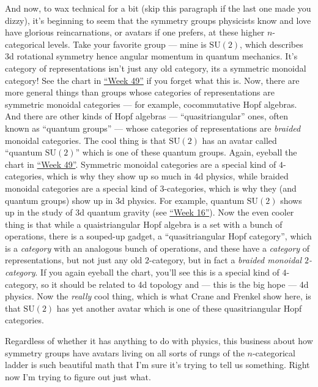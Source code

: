 \documentclass{article}
\begin{document}
And now, to wax technical for a bit (skip this paragraph if the last one
made you dizzy), it's beginning to seem that the symmetry groups
physicists know and love have glorious reincarnations, or avatars if one
prefers, at these higher \(n\)-categorical levels. Take your favorite
group --- mine is \(\mathrm{SU}(2)\), which describes 3d rotational
symmetry hence angular momentum in quantum mechanics. It's category of
representations isn't just any old category, its a symmetric monoidal
category! See the chart in \protect\hyperlink{week49}{``Week 49''} if
you forget what this is. Now, there are more general things than groups
whose categories of representations are symmetric monoidal categories
--- for example, cocommutative Hopf algebras. And there are other kinds
of Hopf algebras --- ``quasitriangular'' ones, often known as ``quantum
groups'' --- whose categories of representations are \emph{braided}
monoidal categories. The cool thing is that \(\mathrm{SU}(2)\) has an
avatar called ``quantum \(\mathrm{SU}(2)\)'' which is one of these
quantum groups. Again, eyeball the chart in
\protect\hyperlink{week49}{``Week 49''}. Symmetric monoidal categories
are a special kind of \(4\)-categories, which is why they show up so
much in 4d physics, while braided monoidal categories are a special kind
of \(3\)-categories, which is why they (and quantum groups) show up in
3d physics. For example, quantum \(\mathrm{SU}(2)\) shows up in the
study of 3d quantum gravity (see \protect\hyperlink{week16}{``Week
16''}). Now the even cooler thing is that while a quaistriangular Hopf
algebra is a set with a bunch of operations, there is a souped-up
gadget, a ``quasitriangular Hopf category'', which is a \emph{category}
with an analogous bunch of operations, and these have a \emph{category}
of representations, but not just any old \(2\)-category, but in fact a
\emph{braided monoidal \(2\)-category}. If you again eyeball the chart,
you'll see this is a special kind of \(4\)-category, so it should be
related to 4d topology and --- this is the big hope --- 4d physics. Now
the \emph{really} cool thing, which is what Crane and Frenkel show here,
is that \(\mathrm{SU}(2)\) has yet another avatar which is one of these
quasitriangular Hopf categories.

Regardless of whether it has anything to do with physics, this business
about how symmetry groups have avatars living on all sorts of rungs of
the \(n\)-categorical ladder is such beautiful math that I'm sure it's
trying to tell us something. Right now I'm trying to figure out just
what.
\end{document}
